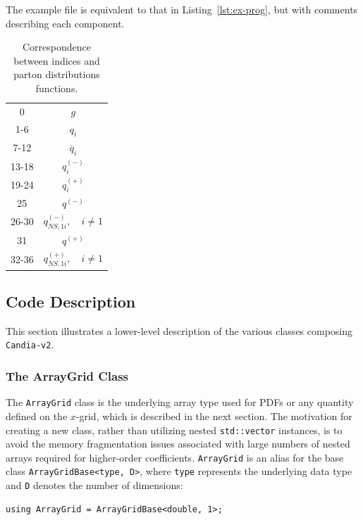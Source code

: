 \documentclass[preprint,12pt]{elsarticle}
\begin{document}
The example file  is equivalent to that in Listing~\ref{lst:ex-prog}, but with comments describing each component.

\begin{table}[h]
  \centering
  \begin{tabular}{c|c}
    \hline 
    0 & $g$ \\ 
    1-6 & $q_{i}$ \\ 
    7-12 & $\overline{q}_i$ \\ 
    13-18 & $q_{i}^{(-)}$ \\ 
    19-24 & $q_{i}^{(+)}$ \\ 
    25 & $q^{(-)}$ \\ 
    26-30 & $q_{NS,1i}^{(-)},\quad i\neq1$ \\ 
    31 & $q^{(+)}$ \\ 
    32-36 & $q_{NS,1i}^{(+)},\quad i\neq1$ \\ 
    \hline
  \end{tabular}
  \caption{Correspondence between indices and parton distributions functions.}
  \label{tab:dist-indices}
\end{table}


\subsection{Code Description}
\label{sec:code-description}

This section illustrates a lower-level description of the various classes composing \texttt{Candia-v2}.

\subsubsection{The ArrayGrid Class}
\label{subsec:arraygrid}

The \texttt{ArrayGrid} class is the underlying array type used for PDFs 
or any quantity defined on the $x$-grid, which is described in the next section. The motivation for creating a new class, rather than utilizing nested \texttt{std::vector} 
instances, is to avoid the memory fragmentation issues associated with large numbers of nested arrays 
required for higher-order coefficients. \texttt{ArrayGrid} is an alias for the base 
class \texttt{ArrayGridBase<type, D>}, where \texttt{type} represents the 
underlying data type and \texttt{D} denotes the number of dimensions:

\begin{verbatim}
using ArrayGrid = ArrayGridBase<double, 1>;
\end{verbatim}
\end{document}
